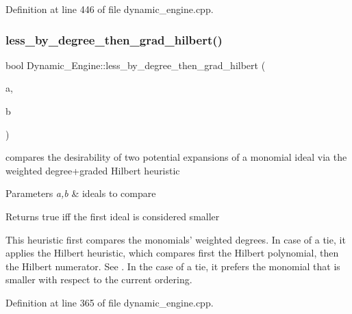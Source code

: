 Definition at line 446 of file dynamic\+\_\+engine.\+cpp.

\mbox{\label{namespace_dynamic___engine_ab5f217efe789e73d511ab04ae93942f1}} 
\subsubsection{\texorpdfstring{less\+\_\+by\+\_\+degree\+\_\+then\+\_\+grad\+\_\+hilbert()}{less\_by\_degree\_then\_grad\_hilbert()}}
{\footnotesize\ttfamily bool Dynamic\+\_\+\+Engine\+::less\+\_\+by\+\_\+degree\+\_\+then\+\_\+grad\+\_\+hilbert (\begin{DoxyParamCaption}\item[{\hyperlink{group___g_b_computation_class_dynamic___engine_1_1_p_p___with___ideal}{P\+P\+\_\+\+With\+\_\+\+Ideal} \&}]{a,  }\item[{\hyperlink{group___g_b_computation_class_dynamic___engine_1_1_p_p___with___ideal}{P\+P\+\_\+\+With\+\_\+\+Ideal} \&}]{b }\end{DoxyParamCaption})}



compares the desirability of two potential expansions of a monomial ideal via the weighted degree+graded Hilbert heuristic 


\begin{DoxyParams}{Parameters}
{\em a,b} & ideals to compare \\
\hline
\end{DoxyParams}
\begin{DoxyReturn}{Returns}
{\ttfamily true} iff the first ideal is considered smaller
\end{DoxyReturn}
This heuristic first compares the monomials' weighted degrees. In case of a tie, it applies the Hilbert heuristic, which compares first the Hilbert polynomial, then the Hilbert numerator. See \cite{CaboaraDynAlg}. In the case of a tie, it prefers the monomial that is smaller with respect to the current ordering. 

Definition at line 365 of file dynamic\+\_\+engine.\+cpp.

\mbox{\label{namespace_dynamic___engine_ae94f12023f4a0c1bf246afc31cd0538e}} 
